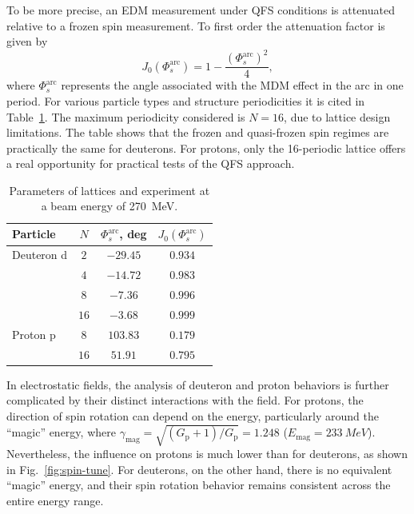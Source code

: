 \documentclass[%
  aps,
  pra,
  preprint,
  a4paper,
  amsmath,
  amssymb,
  floatfix,
  longbibliography,
  superscriptaddress
]{revtex4-2}
\begin{document}
To be more precise, an EDM measurement under QFS conditions is attenuated
relative to a frozen spin measurement. To first order the attenuation factor
is given by~\cite{Senichev:2023vtx}
\begin{equation}
  J_{0}(\Phi_s^{\mathrm{arc}})=1-\frac{(\Phi_s^{\mathrm{arc}})^2}{4},
  \label{eq:edm_j0}
\end{equation}
where $\Phi_s^{\mathrm{arc}}$ represents the angle associated with the MDM
effect in the arc in one period. For various particle types and structure
periodicities it is cited in Table~\ref{tab:edm}. The maximum periodicity
considered is $N=16$, due to lattice design limitations. The table shows that
the frozen and quasi-frozen spin regimes are practically the same for
deuterons. For protons, only the 16-periodic lattice offers a real opportunity for practical tests of the
QFS approach.

\begin{table}[htbp]
  \centering
  \caption{Parameters of lattices and experiment at a beam energy of
    \SI{270}{MeV}.}
  \label{tab:edm}
  \begin{tabular}{lccc}
    \toprule
    Particle & $N$ & $\Phi_s^{\mathrm{arc}}$, deg & $J_{0}(\Phi_s^{\mathrm{arc}})$ \\
    \midrule
    Deuteron d & $2$ & $-29.45$ & $0.934$ \\
               & $4$ & $-14.72$ & $0.983$ \\
               & $8$ & $-7.36$ & $0.996$ \\
               & $16$ & $-3.68$ & $0.999$ \\
    Proton p & $8$ & $103.83$ & $0.179$ \\
             & $16$ & $51.91$ & $0.795$ \\
    \bottomrule
  \end{tabular}
\end{table}

In electrostatic fields, the analysis of deuteron and proton behaviors is
further complicated by their distinct interactions with the field. For protons,
the direction of spin rotation can depend on the energy, particularly around
the ``magic'' energy, where
$\gamma_{\mathrm{mag}} = \sqrt{(G_{\mathrm{p}}+1)/G_{\mathrm{p}}} = 1.248$
($E_{\mathrm{mag}} = \SI{233}{MeV}$). Nevertheless, the influence on protons is much lower than for deuterons, as
shown in Fig.~\ref{fig:spin-tune}. For
deuterons, on the other hand, there is no equivalent ``magic'' energy, and
their spin rotation behavior remains consistent across the entire energy
range.
\end{document}
